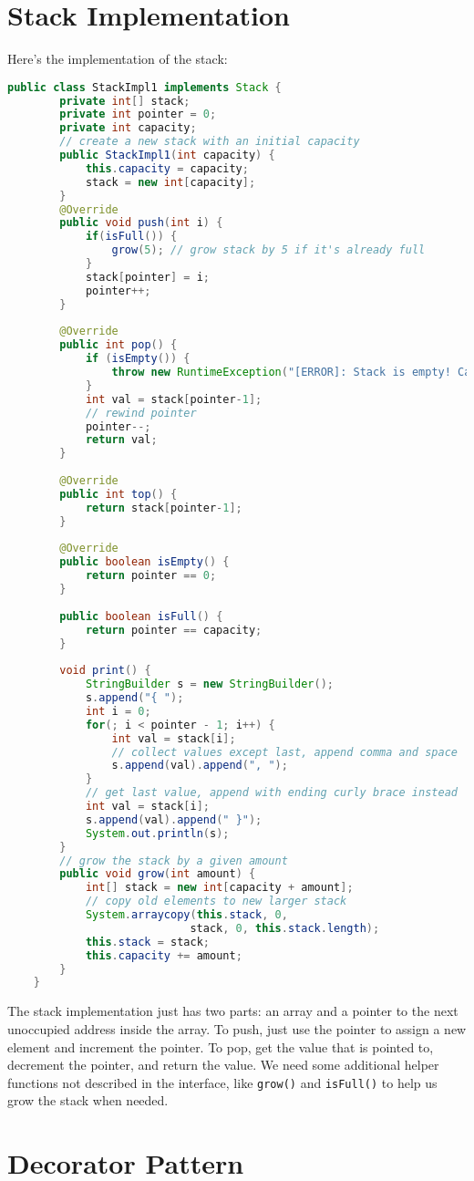 \documentclass[english,12pt]{article}
\begin{document}
\section*{Stack Implementation}
Here's the implementation of the stack:
\begin{lstlisting}[language=java]
    public class StackImpl1 implements Stack {
        private int[] stack;
        private int pointer = 0;
        private int capacity;
        // create a new stack with an initial capacity
        public StackImpl1(int capacity) {
            this.capacity = capacity;
            stack = new int[capacity];
        }
        @Override
        public void push(int i) {
            if(isFull()) {
                grow(5); // grow stack by 5 if it's already full
            }
            stack[pointer] = i;
            pointer++;
        }
    
        @Override
        public int pop() {
            if (isEmpty()) {
                throw new RuntimeException("[ERROR]: Stack is empty! Cannot pop an element!");
            }
            int val = stack[pointer-1];
            // rewind pointer
            pointer--;
            return val;
        }
    
        @Override
        public int top() {
            return stack[pointer-1];
        }
    
        @Override
        public boolean isEmpty() {
            return pointer == 0;
        }
    
        public boolean isFull() {
            return pointer == capacity;
        }
    
        void print() {
            StringBuilder s = new StringBuilder();
            s.append("{ ");
            int i = 0;
            for(; i < pointer - 1; i++) {
                int val = stack[i];
                // collect values except last, append comma and space
                s.append(val).append(", ");
            }
            // get last value, append with ending curly brace instead
            int val = stack[i];
            s.append(val).append(" }");
            System.out.println(s);
        }
        // grow the stack by a given amount
        public void grow(int amount) {
            int[] stack = new int[capacity + amount];
            // copy old elements to new larger stack
            System.arraycopy(this.stack, 0, 
                            stack, 0, this.stack.length);
            this.stack = stack;
            this.capacity += amount;
        }
    } 
\end{lstlisting}
The stack implementation just has two parts: an array and a pointer to the next
unoccupied address inside the array. To push, just use the pointer to assign a new
element and increment the pointer. To pop, get the value that is pointed to,
decrement the pointer, and return the value. We need some additional helper functions
not described in the interface, like \texttt{grow()} and \texttt{isFull()} to help 
us grow the stack when needed.
\section*{Decorator Pattern}
\end{document}
